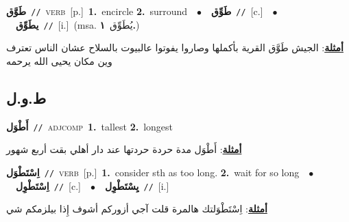 \documentclass[10pt,a4paper,twoside]{article} %
\begin{document}
\begin{multicols}{2}
{\setlength\topsep{0pt}\textbf{\foreignlanguage{arabic}{طَوَّق}}\ {\color{gray}\texttt{//}\color{black}}\ \textsc{verb}\ [p.]\ \textbf{1.}~encircle  \textbf{2.}~surround\ \ $\bullet$\ \ \setlength\topsep{0pt}\textbf{\foreignlanguage{arabic}{طَوِّق}}\ {\color{gray}\texttt{//}\color{black}}\ [c.]\ \ $\bullet$\ \ \setlength\topsep{0pt}\textbf{\foreignlanguage{arabic}{يطَوِّق}}\ {\color{gray}\texttt{//}\color{black}}\ [i.]\ \color{gray}(msa. \foreignlanguage{arabic}{يُطَوِّق}~\foreignlanguage{arabic}{\textbf{١.}})\color{black}\  \begin{flushright}\color{gray}\foreignlanguage{arabic}{\textbf{\underline{\foreignlanguage{arabic}{أمثلة}}}: الجيش طَوَّق القرية بأكملها وصاروا يفوتوا عالبيوت بالسلاح عشان الناس تعترف وين مكان يحيى الله يرحمه}\end{flushright}\color{black}} \vspace{2mm}

\vspace{-3mm}
\subsection*{\color{blue}\foreignlanguage{arabic}{ط.و.ل}\color{blue}{}} 

{\setlength\topsep{0pt}\textbf{\foreignlanguage{arabic}{أَطْوَل}}\ {\color{gray}\texttt{//}\color{black}}\ \textsc{adj\textunderscore comp}\ \textbf{1.}~tallest  \textbf{2.}~longest\  \begin{flushright}\color{gray}\foreignlanguage{arabic}{\textbf{\underline{\foreignlanguage{arabic}{أمثلة}}}: أَطْوَل مدة حردة حردتها عند دار أهلي بقت أربع شهور}\end{flushright}\color{black}} \vspace{2mm}

{\setlength\topsep{0pt}\textbf{\foreignlanguage{arabic}{اِسْتَطْوَل}}\ {\color{gray}\texttt{//}\color{black}}\ \textsc{verb}\ [p.]\ \textbf{1.}~consider sth as too long.  \textbf{2.}~wait for so long\ \ $\bullet$\ \ \setlength\topsep{0pt}\textbf{\foreignlanguage{arabic}{اِسْتَطْوِل}}\ {\color{gray}\texttt{//}\color{black}}\ [c.]\ \ $\bullet$\ \ \setlength\topsep{0pt}\textbf{\foreignlanguage{arabic}{يِسْتَطْوِل}}\ {\color{gray}\texttt{//}\color{black}}\ [i.]\  \begin{flushright}\color{gray}\foreignlanguage{arabic}{\textbf{\underline{\foreignlanguage{arabic}{أمثلة}}}: اِسْتَطْوَلتك هالمرة قلت آجي أزوركم أشوف إِذا بيلزمكم شي}\end{flushright}\color{black}} \vspace{2mm}


\end{multicols}
\end{document}
